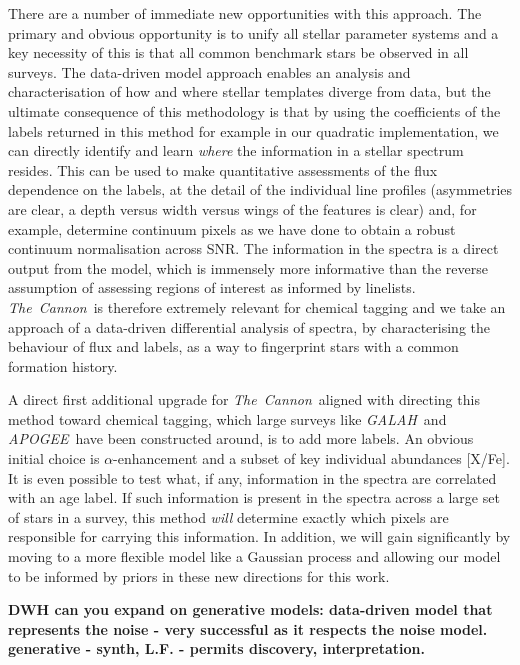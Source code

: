 \documentclass[12pt, preprint]{aastex}
\newcommand{\tc}{\textsl{The~Cannon}}
\newcommand{\apogee}{\textsl{APOGEE}}
\newcommand{\galah}{\textsl{GALAH}}
\begin{document}
There are a number of immediate new opportunities with this approach. The primary and obvious opportunity is to unify all stellar parameter systems and a key necessity of this is that all common benchmark stars be observed in all surveys. The data-driven model approach enables an analysis and characterisation of how and where stellar templates diverge from data, but the ultimate consequence of this methodology is that by using the coefficients of the labels returned in this method for example in our quadratic implementation, we can directly identify and learn \textit{where} the information in a stellar spectrum resides. This can be used to make quantitative assessments of the flux dependence on the labels, at the detail of the individual line profiles (asymmetries are clear, a depth versus width versus wings of the features is clear) and, for example, determine continuum pixels as we have done to obtain a robust continuum normalisation across SNR. The information in the spectra  is a direct output from the model, which is immensely more informative than the reverse assumption of assessing regions of interest as informed by linelists.  \tc\ is therefore extremely relevant for chemical tagging and we take an approach of a data-driven differential analysis of spectra, by characterising the behaviour of flux and labels, as a way to fingerprint stars with a common formation history.

A direct first additional upgrade for \tc\ aligned with directing this method toward chemical tagging, which large surveys like \galah\ and \apogee\ have been constructed around,  is  to add more labels. An obvious initial choice is $\alpha$-enhancement and a subset of key individual abundances [X/Fe]. It is even possible to test what, if any, information in the spectra are correlated with an age label. If such information is present in the spectra across a large set of stars in a survey, this method \textit{will} determine exactly which pixels are responsible for carrying this information. In addition, we will gain significantly by moving to a more flexible model like a Gaussian process and allowing our model to be informed by priors in these new directions for this work. 


\textbf{DWH can you expand on generative models: data-driven model that represents the noise -  very successful as it respects the noise model. generative - synth, L.F. - permits discovery, interpretation.}



\end{document}
